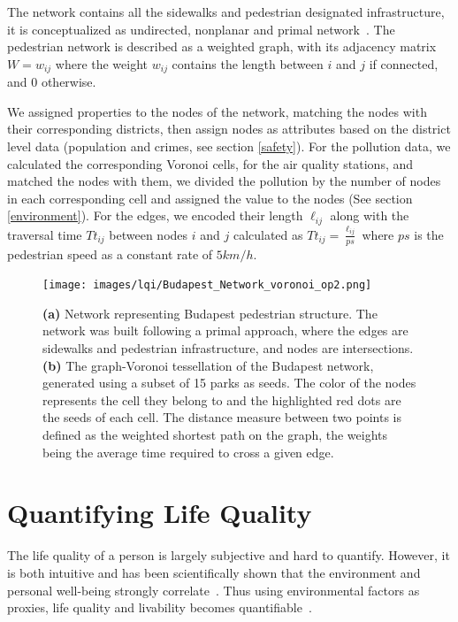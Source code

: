 The network contains all the sidewalks and pedestrian designated infrastructure, it is conceptualized as undirected, nonplanar and primal network~\cite{Porta2006Primal}. The pedestrian network is described as a weighted graph, with its adjacency matrix $W=w_{ij}$ where the weight $w_{ij}$ contains the length between $i$ and $j$ if connected, and $0$ otherwise.

We assigned properties to the nodes of the network, matching the nodes with their corresponding districts, then assign nodes as attributes based on the district level data (population and crimes, see section \ref{safety}). For the pollution data, we calculated the corresponding Voronoi cells, for the air quality stations, and matched the nodes with them, we divided the pollution by the number of nodes in each corresponding cell and assigned the value to the nodes (See section \ref{environment}). For the edges, we encoded their length $\ell_{ij}$ along with the traversal time $Tt_{ij}$ between nodes $i$ and $j$ calculated as $Tt_{ij}=\frac{\ell_{ij}}{ps}$ where $ps$ is the pedestrian speed as a constant rate of $5km/h$.
\begin{figure}[htbp]
	\centering
	\texttt{[image: images/lqi/Budapest\_Network\_voronoi\_op2.png]}
	\caption[Budapest pedestrian network]{\textbf{(a)} Network representing Budapest pedestrian structure. The network was built following a primal approach, where the edges are sidewalks and pedestrian infrastructure, and nodes are intersections. \textbf{(b)} The graph-Voronoi tessellation of the Budapest network, generated using a subset of 15 parks as seeds. The color of the nodes represents the cell they belong to and the highlighted red dots are the seeds of each cell. The distance measure between two points is defined as the weighted shortest path on the graph, the weights being the average time required to cross a given edge.}
	\label{fig:BPnetwork}
\end{figure}

\section{Quantifying Life Quality}
The life quality of a person is largely subjective and hard to quantify. However, it is both intuitive and has been scientifically shown that the environment and personal well-being strongly correlate~\cite{Rosow1961Social}. Thus using environmental factors as proxies, life quality and livability becomes quantifiable~\cite{Kahneman2006Developments}.

